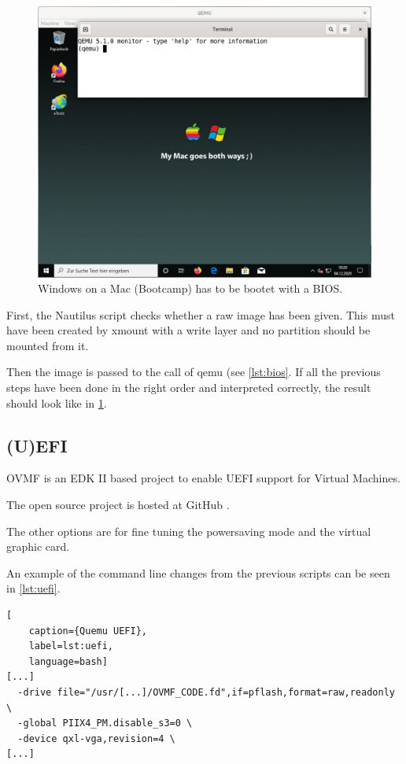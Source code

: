 \begin{figure}[htbp]  %
  \centering
  \includegraphics[width=.75\textwidth]{figures/boot-bios-BOOTCAMP.png}
  \caption[Qemu BIOS]{Windows on a Mac (Bootcamp) has to be bootet with a BIOS.}
  \label{fig:bios}
\end{figure}

\noindent First, the Nautilus script checks whether a raw image has been given. This must have been created by xmount with a write layer and no partition should be mounted from it.

Then the image is passed to the call of qemu (see \cref{lst:bios}. If all the previous steps have been done in the right order and interpreted correctly, the result should look like in \cref{fig:bios}.

\subsection{(U)EFI}

OVMF is an EDK II based project to enable UEFI support for Virtual Machines.

The open source project is hosted at GitHub \cite{Ovmf}.

The other options are for fine tuning the powersaving mode and the virtual graphic card.

An example of the command line changes from the previous scripts can be seen in \cref{lst:uefi}.

\begin{lstlisting}[
    caption={Quemu UEFI},
    label=lst:uefi,
    language=bash]
[...]
  -drive file="/usr/[...]/OVMF_CODE.fd",if=pflash,format=raw,readonly \
  -global PIIX4_PM.disable_s3=0 \
  -device qxl-vga,revision=4 \
[...]
\end{lstlisting}

